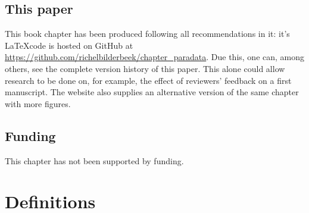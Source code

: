 {\subsection{This paper}

This book chapter has been produced following all recommendations in it:
it's \LaTeX code is hosted on GitHub 
at \url{https://github.com/richelbilderbeek/chapter_paradata}.
Due this, one can, among others, see the complete version history of this paper.
This alone could allow research to be done on, for example,
the effect of reviewers' feedback on a first manuscript.
The website also supplies an alternative version of the same chapter
with more figures.

\subsection{Funding}

This chapter has not been supported by funding.

\section*{Definitions}

}
